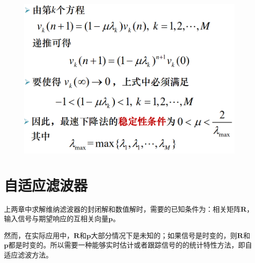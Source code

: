 \documentclass[UTF8]{ctexart} %
\begin{document}
			\begin{figure}[H]
				\centering\includegraphics[scale=0.3]{20.png}
			\end{figure}
			
			
			
			
	\section{自适应滤波器}
		上两章中求解维纳滤波器的封闭解和数值解时，需要的已知条件为：相关矩阵$\textbf{R}$，输入信号与期望响应的互相关向量$\textbf{p}$。
		
		然而，在实际应用中，$\textbf{R}$和$\textbf{p}$大部分情况下是未知的；如果信号是时变的，则$\textbf{R}$和$\textbf{p}$都是时变的。所以需要一种能够实时估计或者跟踪信号的的统计特性方法，即自适应滤波方法。
		
\end{document}

